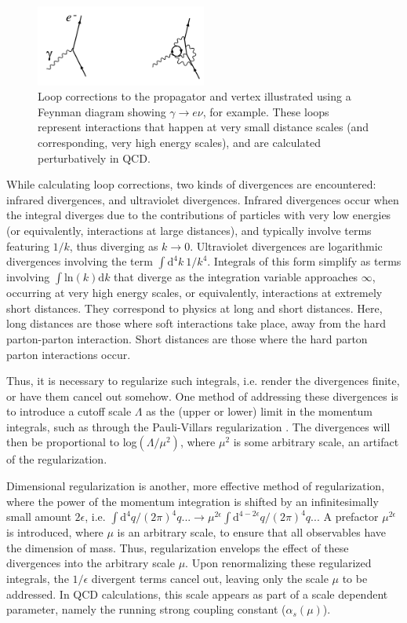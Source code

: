 \documentclass[11pt,a4paper,openright,twoside]{report}
\begin{document}
\begin{figure}[H]
\centering
\includegraphics[width=0.5\textwidth]{renormalize_diagram.png}
\caption{Loop corrections to the propagator and vertex illustrated using a Feynman diagram showing $\gamma\to e\nu$, for example. These loops represent interactions that happen at very small distance scales (and corresponding, very high energy scales), and are calculated perturbatively in QCD.}
\label{fig:loop_corr}
\end{figure}

While calculating loop corrections, two kinds of divergences are encountered: infrared divergences, and ultraviolet divergences. Infrared divergences occur when the integral diverges due to the contributions of particles with very low energies (or equivalently, interactions at large distances), and typically involve terms featuring $1/k$, thus diverging as $k\to 0$. Ultraviolet divergences are logarithmic divergences involving the term $\int \mathrm{d}^4k\ 1/k^4$. Integrals of this form simplify as terms involving $\int \mathrm{ln}(k) \mathrm{d}k$ that diverge as the integration variable approaches $\infty$, occurring at very high energy scales, or equivalently, interactions at extremely short distances. They correspond to physics at long and short distances. Here, long distances are those where soft interactions take place, away from the hard parton-parton interaction. Short distances are those where the hard parton parton interactions occur.

Thus, it is necessary to regularize such integrals, i.e. render the divergences finite, or have them cancel out somehow. One method of addressing these divergences is to introduce a cutoff scale $\Lambda$ as the (upper or lower) limit in the momentum integrals, such as through the Pauli-Villars regularization \cite{Pauli-Villars}. The divergences will then be proportional to log$(\Lambda/\mu^2)$, where $\mu^2$ is some arbitrary scale, an artifact of the regularization.

Dimensional regularization is another, more effective method of regularization, where the power of the momentum integration is shifted by an infinitesimally small amount $2\epsilon$, i.e. $\int \mathrm{d}^4q/(2\pi)^4 q... \to \mu^{2\epsilon}\int \mathrm{d}^{4-2\epsilon}q/(2\pi)^4 q...$ A prefactor $\mu^{2\epsilon}$ is introduced, where $\mu$ is an arbitrary scale, to ensure that all observables have the dimension of mass. Thus, regularization envelops the effect of these divergences into the arbitrary scale $\mu$. Upon renormalizing these regularized integrals, the $1/\epsilon$ divergent terms cancel out, leaving only the scale $\mu$ to be addressed. In QCD calculations, this scale appears as part of a scale dependent parameter, namely the running strong coupling constant ($\alpha_s(\mu)$).
\end{document}
